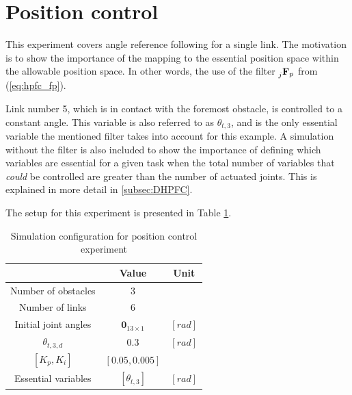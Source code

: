 \section{Position control}

This experiment covers angle reference following for a single link. The motivation is to show the importance of the mapping to the essential position space within the allowable position space. In other words, the use of the filter $\prescript{}{j}{\mathbf{F}}_{p}$ from (\ref{eq:hpfc_fp}).

Link number 5, which is in contact with the foremost obstacle, is controlled to a constant angle. This variable is also referred to as $\theta_{t,3}$, and is the only essential variable the mentioned filter takes into account for this example. A simulation without the filter is also included to show the importance of defining which variables are essential for a given task when the total number of variables that \textit{could} be controlled are greater than the number of actuated joints. This is explained in more detail in \ref{subsec:DHPFC}.

The setup for this experiment is presented in Table \ref{tab:exp_single_pos}.

\begin{table}[]
    \centering
    \begin{tabular}{|c|c|c|}
        \hline
        & Value & Unit\\
        \hline
        Number of obstacles & $3$ & \\
        Number of links & $6$ & \\
        Initial joint angles & $\mathbf{0}_{13 \times 1}$ & $[rad]$ \\
        $\theta_{t,3,d}$ & $0.3$ & $[rad]$ \\
        $[K_p, K_i]$ & $[0.05, 0.005]$ &\\
        Essential variables & $[\theta_{t,3}]$ & $[rad]$ \\
        \hline
    \end{tabular}
    \caption{Simulation configuration for position control experiment}
    \label{tab:exp_single_pos}
\end{table}

